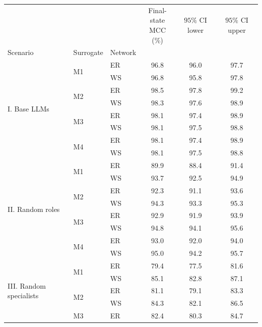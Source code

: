 \begin{table}[ht]
\centering
\begin{adjustbox}{width=\columnwidth}
\begin{tabular}{lllccc}
\toprule
 &  &  & \makecell{Final-state \\ MCC (\%)} & \makecell{\(95\%\) CI \\ lower} & \makecell{\(95\%\) CI \\ upper} \\
Scenario & Surrogate & Network &  &  &  \\
\midrule
\multirow[c]{8}{*}{I. Base LLMs} & \multirow[c]{2}{*}{M1} & ER & 96.8 & 96.0 & 97.7 \\
 &  & WS & 96.8 & 95.8 & 97.8 \\
\cline{2-6}
 & \multirow[c]{2}{*}{M2} & ER & 98.5 & 97.8 & 99.2 \\
 &  & WS & 98.3 & 97.6 & 98.9 \\
\cline{2-6}
 & \multirow[c]{2}{*}{M3} & ER & 98.1 & 97.4 & 98.9 \\
 &  & WS & 98.1 & 97.5 & 98.8 \\
\cline{2-6}
 & \multirow[c]{2}{*}{M4} & ER & 98.1 & 97.4 & 98.9 \\
 &  & WS & 98.1 & 97.5 & 98.8 \\
\cline{1-6} \cline{2-6}
\multirow[c]{8}{*}{II. Random roles} & \multirow[c]{2}{*}{M1} & ER & 89.9 & 88.4 & 91.4 \\
 &  & WS & 93.7 & 92.5 & 94.9 \\
\cline{2-6}
 & \multirow[c]{2}{*}{M2} & ER & 92.3 & 91.1 & 93.6 \\
 &  & WS & 94.3 & 93.3 & 95.3 \\
\cline{2-6}
 & \multirow[c]{2}{*}{M3} & ER & 92.9 & 91.9 & 93.9 \\
 &  & WS & 94.8 & 94.1 & 95.6 \\
\cline{2-6}
 & \multirow[c]{2}{*}{M4} & ER & 93.0 & 92.0 & 94.0 \\
 &  & WS & 95.0 & 94.2 & 95.7 \\
\cline{1-6} \cline{2-6}
\multirow[c]{8}{*}{III. Random specialists} & \multirow[c]{2}{*}{M1} & ER & 79.4 & 77.5 & 81.6 \\
 &  & WS & 85.1 & 82.8 & 87.1 \\
\cline{2-6}
 & \multirow[c]{2}{*}{M2} & ER & 81.1 & 79.1 & 83.3 \\
 &  & WS & 84.3 & 82.1 & 86.5 \\
\cline{2-6}
 & \multirow[c]{2}{*}{M3} & ER & 82.4 & 80.3 & 84.7 \\

\end{tabular}
\end{adjustbox}
\end{table}
